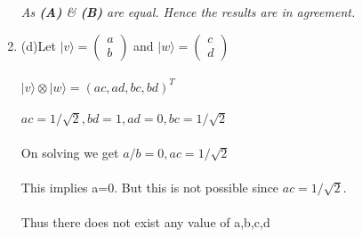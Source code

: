 \documentclass[a4paper,12pt]{article}
\begin{document}
\begin{enumerate}[label=(\alph*)]
          \vspace{0.5cm}

          \begin{center}
              \emph{As \textbf{(A)} \& \textbf{(B)} are equal. Hence the results are in agreement.}
          \end{center}

    \item
          \vspace{10mm}\begin{flushleft}
              (d)\hspace{3mm}Let $ |v\rangle = \begin{pmatrix} a \\ b\end{pmatrix}$ and $ |w\rangle = \begin{pmatrix} c \\ d\end{pmatrix}$
              \\~\\
              $|v\rangle \otimes |w\rangle = ( ac , ad , bc , bd )^T $
              \\~\\
              $ ac=1/\sqrt{2}, bd=1, ad=0, bc=1/\sqrt{2} $
              \\~\\
              On solving we get $a/b = 0 , ac=1/\sqrt{2}$
              \\~\\
              This implies a=0. But this is not possible since $ac=1/\sqrt{2}$.
              \\~\\
              Thus there does not exist any value of a,b,c,d
          \end{flushleft}

\end{enumerate}
\end{document}
